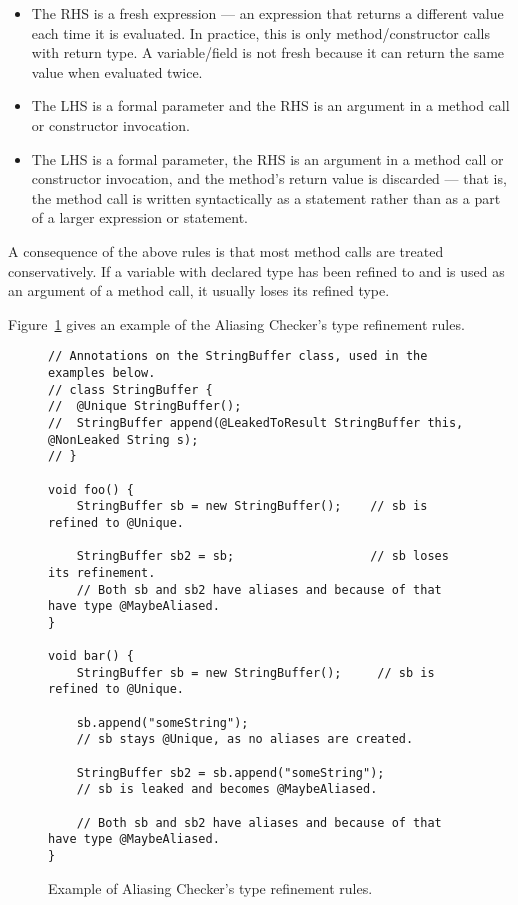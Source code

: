 \begin{itemize}
\item
The RHS is a fresh expression --- an expression that returns a different value
each time it is evaluated. In practice, this is only method/constructor calls
with  return type. A variable/field is not fresh because it can
return the same value when evaluated twice.
\item
The LHS is a  formal parameter and the RHS is an argument in a
method call or constructor invocation.
\item
The LHS is a  formal parameter, the RHS is an argument in
a method call or constructor invocation, and the method's return value is
discarded --- that is, the method call is written syntactically as a statement
rather than as a part of a larger expression or statement.
\end{itemize}

A consequence of the above rules is that most method calls are treated conservatively.
If a variable with declared type  has been refined
to  and is used as an argument of a method call, it usually loses its
 refined type.


Figure~\ref{fig-aliasing-refinement-example} gives an example of the Aliasing Checker's
type refinement rules.

\begin{figure}
\begin{smaller}
\begin{Verbatim}
// Annotations on the StringBuffer class, used in the examples below.
// class StringBuffer {
//  @Unique StringBuffer();
//  StringBuffer append(@LeakedToResult StringBuffer this, @NonLeaked String s);
// }

void foo() {
    StringBuffer sb = new StringBuffer();    // sb is refined to @Unique.

    StringBuffer sb2 = sb;                   // sb loses its refinement.
    // Both sb and sb2 have aliases and because of that have type @MaybeAliased.
}

void bar() {
    StringBuffer sb = new StringBuffer();     // sb is refined to @Unique.

    sb.append("someString");
    // sb stays @Unique, as no aliases are created.

    StringBuffer sb2 = sb.append("someString");
    // sb is leaked and becomes @MaybeAliased.

    // Both sb and sb2 have aliases and because of that have type @MaybeAliased.
}

\end{Verbatim}
\end{smaller}
\caption{Example of Aliasing Checker's type refinement rules.}
\label{fig-aliasing-refinement-example}
\end{figure}

